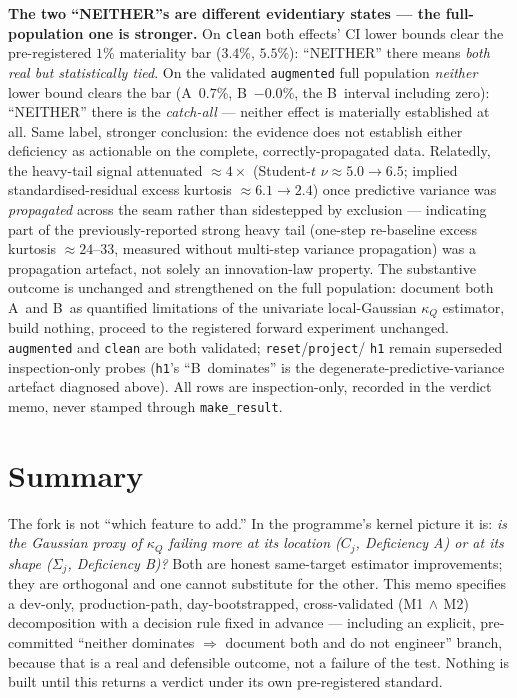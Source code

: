 \documentclass[11pt]{article}
\newcommand{\kQ}{\kappa_{Q}}
\newcommand{\defA}{\textsf{A}}
\newcommand{\defB}{\textsf{B}}
\begin{document}
\textbf{The two ``NEITHER''s are different evidentiary states --- the
full-population one is stronger.} On \texttt{clean} both effects'
CI lower bounds clear the pre-registered $1\%$ materiality bar
($3.4\%$, $5.5\%$): ``NEITHER'' there means \emph{both real but
statistically tied}. On the validated \texttt{augmented} full
population \emph{neither} lower bound clears the bar (\defA\ $0.7\%$,
\defB\ $-0.0\%$, the \defB\ interval including zero): ``NEITHER'' there
is the \emph{catch-all} --- neither effect is materially established at
all. Same label, stronger conclusion: the evidence does not establish
either deficiency as actionable on the complete, correctly-propagated
data. Relatedly, the heavy-tail signal attenuated ${\approx}4\times$
(Student-$t$ $\nu\approx5.0\to6.5$; implied standardised-residual
excess kurtosis ${\approx}6.1\to2.4$) once predictive variance was
\emph{propagated} across the seam rather than sidestepped by
exclusion --- indicating part of the previously-reported strong
heavy tail (one-step re-baseline excess kurtosis ${\approx}24$--$33$,
measured without multi-step variance propagation) was a propagation
artefact, not solely an innovation-law property. The substantive
outcome is unchanged and strengthened on the full population:
document both \defA\ and \defB\ as quantified limitations of the
univariate local-Gaussian $\kQ$ estimator, build nothing, proceed to
the
registered forward experiment unchanged. \texttt{augmented} and
\texttt{clean} are both validated; \texttt{reset}/\texttt{project}/%
\texttt{h1} remain superseded inspection-only probes (\texttt{h1}'s
``\defB\ dominates'' is the degenerate-predictive-variance artefact
diagnosed above). All rows are inspection-only, recorded in the
verdict memo, never stamped through \texttt{make\_result}.

\section{Summary}

The fork is not ``which feature to add.'' In the programme's kernel
picture it is: \emph{is the Gaussian proxy of $\kQ$ failing more at its
location ($C_j$, Deficiency \defA) or at its shape ($\Sigma_j$,
Deficiency \defB)?} Both are honest same-target estimator improvements;
they are orthogonal and one cannot substitute for the other. This memo
specifies a dev-only, production-path, day-bootstrapped, cross-validated
(M1$\,\wedge\,$M2) decomposition with a decision rule fixed in
advance --- including an explicit, pre-committed ``neither dominates
$\Rightarrow$ document both and do not engineer'' branch, because that is
a real and defensible outcome, not a failure of the test. Nothing is
built until this returns a verdict under its own pre-registered standard.
\end{document}
